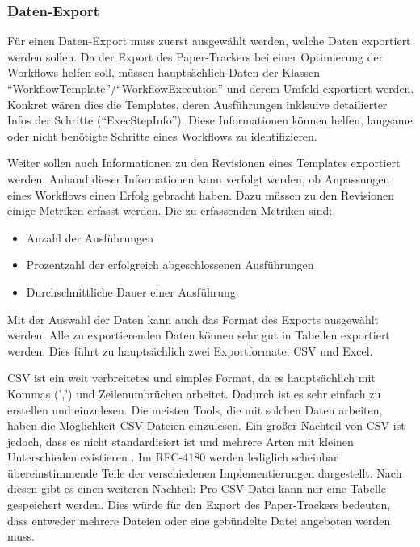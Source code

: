 \subsubsection{Daten-Export}

Für einen Daten-Export muss zuerst ausgewählt werden, welche Daten exportiert werden sollen.
Da der Export des Paper-Trackers bei einer Optimierung der Workflows helfen soll, müssen hauptsächlich Daten der
Klassen \enquote{WorkflowTemplate}/\enquote{WorkflowExecution} und derem Umfeld exportiert werden.
Konkret wären dies die Templates, deren Ausführungen inklsuive detailierter Infos der Schritte (\enquote{ExecStepInfo}).
Diese Informationen können helfen, langsame oder nicht benötigte Schritte eines Workflows zu identifizieren.

Weiter sollen auch Informationen zu den Revisionen eines Templates exportiert werden.
Anhand dieser Informationen kann verfolgt werden, ob Anpassungen eines Workflows einen Erfolg gebracht haben.
Dazu müssen zu den Revisionen einige Metriken erfasst werden.
Die zu erfassenden Metriken sind:
\begin{itemize}
	\item Anzahl der Ausführungen
	\item Prozentzahl der erfolgreich abgeschlossenen Ausführungen
	\item Durchschnittliche Dauer einer Ausführung
\end{itemize}

Mit der Auswahl der Daten kann auch das Format des Exports ausgewählt werden.
Alle zu exportierenden Daten können sehr gut in Tabellen exportiert werden.
Dies führt zu hauptsächlich zwei Exportformate: \gls{CSV} und Excel.

\gls{CSV} ist ein weit verbreitetes und simples Format, da es hauptsächlich mit Kommas (',') und Zeilenumbrüchen arbeitet.
Dadurch ist es sehr einfach zu erstellen und einzulesen.
Die meisten Tools, die mit solchen Daten arbeiten, haben die Möglichkeit \gls{CSV}-Dateien einzulesen.
Ein großer Nachteil von \gls{CSV} ist jedoch, dass es nicht standardisiert ist und mehrere Arten
mit kleinen Unterschieden existieren \cite{rfc4180}.
Im RFC-4180 werden lediglich scheinbar übereinstimmende Teile der verschiedenen Implementierungen dargestellt.
Nach diesen gibt es einen weiteren Nachteil: Pro \gls{CSV}-Datei kann nur eine Tabelle gespeichert werden.
Dies würde für den Export des Paper-Trackers bedeuten, dass entweder mehrere Dateien oder eine gebündelte Datei angeboten werden muss.

